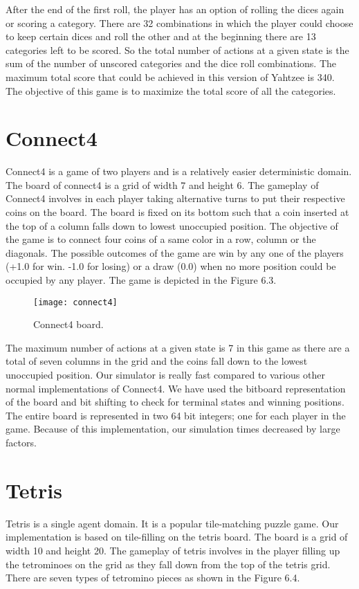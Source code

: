 \documentclass[double,12pt]{beavtex}
\begin{document}
After the end of the first roll, the player has an option of rolling the dices again or scoring a category. There are 32 combinations in which the player could choose to keep certain dices and roll the other and at the beginning there are 13 categories left to be scored. So the total number of actions at a given state is the sum of the number of unscored categories and the dice roll combinations. The maximum total score that could be achieved in this version of Yahtzee is 340. The objective of this game is to maximize the total score of all the categories. 

\section{Connect4}
Connect4 is a game of two players and is a relatively easier deterministic domain. The board of connect4 is a grid of width 7 and height 6. The gameplay of Connect4 involves in each player taking alternative turns to put their respective coins on the board. The board is fixed on its bottom such that a coin inserted at the top of a column falls down to lowest unoccupied position. The objective of the game is to connect four coins of a same color in a row, column or the diagonals. The possible outcomes of the game are win by any one of the players (+1.0 for win. -1.0 for losing) or a draw (0.0) when no more position could be occupied by any player. The game is depicted in the Figure 6.3.

\begin{figure}[!ht]
\centering
\texttt{[image: connect4]}
\caption{Connect4 board.}
\end{figure}

The maximum number of actions at a given state is 7 in this game as there are a total of seven columns in the grid and the coins fall down to the lowest unoccupied position. Our simulator is really fast compared to various other normal implementations of Connect4. We have used the bitboard representation of the board and bit shifting to check for terminal states and winning positions. The entire board is represented in two 64 bit integers; one for each player in the game. Because of this implementation, our simulation times decreased by large factors.  

\section{Tetris}
Tetris is a single agent domain. It is a popular tile-matching puzzle game. Our implementation is based on tile-filling on the tetris board. The board is a grid of width 10 and height 20. The gameplay of tetris involves in the player filling up the tetrominoes on the grid as they fall down from the top of the tetris grid. There are seven types of tetromino pieces as shown in the Figure 6.4. 
\end{document}
